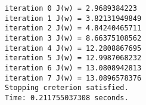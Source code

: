 \documentclass[11pt]{article}
\begin{document}
    \begin{Verbatim}[commandchars=\\\{\}]
iteration 0 J(w) = 2.9689384223
iteration 1 J(w) = 3.82131949849
iteration 2 J(w) = 4.84240465711
iteration 3 J(w) = 8.66375108562
iteration 4 J(w) = 12.2808867695
iteration 5 J(w) = 12.9987068232
iteration 6 J(w) = 13.0808942813
iteration 7 J(w) = 13.0896578376
Stopping creterion satisfied.
Time: 0.211755037308 seconds.

    \end{Verbatim}

    \begin{center}
    \end{center}
    { \hspace*{\fill} \\}
    

    
    
    
    
\end{document}
